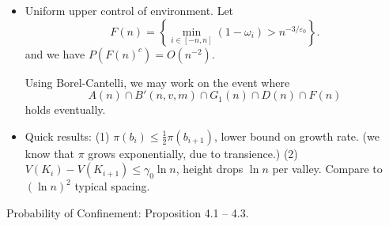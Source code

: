 \begin{itemize}
		Thus, we have on one hand, valleys in $[-n, n]$ are deeper than $\frac{1}{\kappa}\left( \ln n - 4 \ln \ln n \right) $ ($p = O(n^{-2})$), on the other hand, shallower than  $\frac{1}{\kappa}(\ln n + 2 \ln \ln n)$ (eventually).
		\[
			\ln n - 4 \ln \ln n \leq \kappa H_i \le \ln n + 2 \ln \ln n,  \quad K_i \text{placed between }[-n, n]
		.\]
		

	\item Uniform upper control of environment. Let 
		\[
			F(n)=\left\{\min _{i \in[-n, n]}\left(1-\omega_i\right)>n^{-3 / \varepsilon_0}\right\}
		.\] 
		and we have
		$P(F(n)^c) = O(n^{-2})$.
	

	Using Borel-Cantelli, we may work on the event where
	\[
		A(n) \cap B'(n, v, m) \cap G_1(n) \cap D(n) \cap F(n)
	\] 
	holds eventually.

\item Quick results: (1) $\pi(b_i) \le \frac{1}{2} \pi(b_{i + 1})$, lower bound on growth rate. (we know that $\pi$ grows exponentially, due to transience.) (2) $V(K_i) - V(K_{i + 1}) \le  \gamma_0 \ln n$, height drops $\ln n$ per valley. Compare to $ (\ln n)^2$ typical spacing.
\end{itemize}


Probability of Confinement: Proposition 4.1 -- 4.3.








